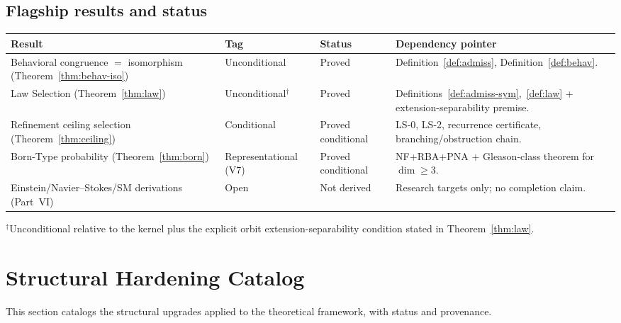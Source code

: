 \documentclass[11pt,a4paper]{article}
\theoremstyle{definition}
\theoremstyle{remark}
\begin{document}
\subsection*{Flagship results and status}
\begin{center}\small
\begin{tabular}{p{3.5cm}p{2cm}p{2.2cm}p{4.2cm}}
\toprule
\textbf{Result} & \textbf{Tag} & \textbf{Status} & \textbf{Dependency pointer} \\
\midrule
Behavioral congruence $=$ isomorphism (Theorem~\ref{thm:behav-iso}) & Unconditional & Proved & Definition~\ref{def:admiss}, Definition~\ref{def:behav}. \\
\addlinespace
Law Selection (Theorem~\ref{thm:law}) & Unconditional$^\dagger$ & Proved & Definitions~\ref{def:admiss-sym},~\ref{def:law} + extension-separability premise. \\
\addlinespace
Refinement ceiling selection (Theorem~\ref{thm:ceiling}) & Conditional & Proved conditional & LS-0, LS-2, recurrence certificate, branching/obstruction chain. \\
\addlinespace
Born-Type probability (Theorem~\ref{thm:born}) & Representational (V7) & Proved conditional & NF+RBA+PNA + Gleason-class theorem for $\dim \ge 3$. \\
\addlinespace
Einstein/Navier--Stokes/SM derivations (Part~VI) & Open & Not derived & Research targets only; no completion claim. \\
\bottomrule
\end{tabular}
\end{center}

{\footnotesize $^\dagger$Unconditional relative to the kernel plus the explicit orbit extension-separability condition stated in Theorem~\ref{thm:law}.}

\section{Structural Hardening Catalog}\label{app:hardening}

This section catalogs the structural upgrades applied to the theoretical framework, with status and provenance.
\end{document}
